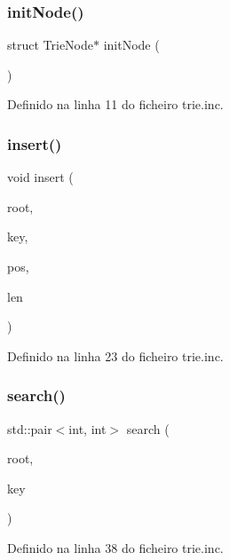 \subsubsection{\texorpdfstring{init\+Node()}{initNode()}}
{\footnotesize\ttfamily struct Trie\+Node$\ast$ init\+Node (\begin{DoxyParamCaption}{ }\end{DoxyParamCaption})}



Definido na linha 11 do ficheiro trie.\+inc.

\mbox{\label{trie_8inc_a9a7f39351f2c01eda907df97a6d97267}} 
\subsubsection{\texorpdfstring{insert()}{insert()}}
{\footnotesize\ttfamily void insert (\begin{DoxyParamCaption}\item[{struct Trie\+Node $\ast$}]{root,  }\item[{std\+::string}]{key,  }\item[{int}]{pos,  }\item[{int}]{len }\end{DoxyParamCaption})}



Definido na linha 23 do ficheiro trie.\+inc.

\mbox{\label{trie_8inc_a3c9d3332949146639636c0659d6f5c6f}} 
\subsubsection{\texorpdfstring{search()}{search()}}
{\footnotesize\ttfamily std\+::pair$<$int, int$>$ search (\begin{DoxyParamCaption}\item[{struct Trie\+Node $\ast$}]{root,  }\item[{std\+::string}]{key }\end{DoxyParamCaption})}



Definido na linha 38 do ficheiro trie.\+inc.

